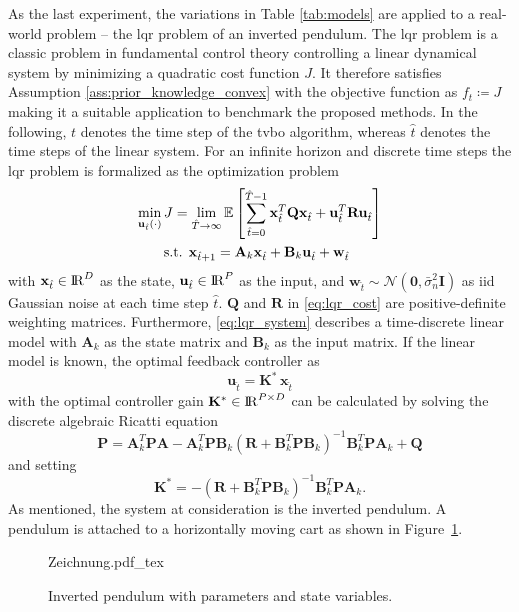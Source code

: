 As the last experiment, the variations in Table \ref{tab:models} are applied to a real-world problem -- the \gls{lqr} problem of an inverted pendulum. The \gls{lqr} problem is a classic problem in fundamental control theory controlling a linear dynamical system by minimizing a quadratic cost function $J$. It therefore satisfies Assumption \ref{ass:prior_knowledge_convex} with the objective function as $f_t \coloneqq J$ making it a suitable application to benchmark the proposed methods. In the following, $t$ denotes the time step of the \gls{tvbo} algorithm, whereas $\hat{t}$ denotes the time steps of the linear system. For an infinite horizon and discrete time steps the \gls{lqr} problem is formalized as the optimization problem
\begin{align}
    \min_{\mathbf{u}_{\hat{t}}(\cdot)}\, &J=\lim_{\hat{T} \to \infty} \operatorname{\mathbb{E}} \left[ \sum_{{\hat{t}}=0}^{\hat{T}-1} \mathbf{x}_{\hat{t}}^T \mathbf{Q}\mathbf{x}_{\hat{t}} +  \mathbf{u}_{\hat{t}}^T \mathbf{R}\mathbf{u}_{\hat{t}} \right] \label{eq:lqr_cost}\\
    &\text{s.t. }\mathbf{x}_{\hat{t}+1} = \mathbf{A}_k\mathbf{x}_{\hat{t}} + \mathbf{B}_k\mathbf{u}_{\hat{t}} + \mathbf{w}_{\hat{t}} \label{eq:lqr_system}
\end{align}
with $\mathbf{x}_{\hat{t}} \in \mathrm{I\!R}^D$ as the state, $\mathbf{u}_{\hat{t}} \in \mathrm{I\!R}^P$ as the input, and $\mathbf{w}_{\hat{t}} \sim \mathcal{N}(\mathbf{0}, \bar{\sigma}_n^2 \mathbf{I})$ as iid Gaussian noise at each time step $\hat{t}$. $\mathbf{Q}$ and $\mathbf{R}$ in \eqref{eq:lqr_cost} are positive-definite weighting matrices. Furthermore, \eqref{eq:lqr_system} describes a time-discrete linear model with $\mathbf{A}_k$ as the state matrix and $\mathbf{B}_k$ as the input matrix. If the linear model is known, the optimal feedback controller as
\begin{equation}
    \mathbf{u}_{\hat{t}} = \mathbf{K}^* \, \mathbf{x}_{\hat{t}}
\end{equation}
with the optimal controller gain $\mathbf{K}^* \in \mathrm{I\!R}^{P \times D}$ can be calculated by solving the discrete algebraic Ricatti equation
\begin{equation}
    \mathbf{P} = \mathbf{A}_k^T \mathbf{P} \mathbf{A}- \mathbf{A}_k^T \mathbf{P} \mathbf{B}_k \left(\mathbf{R}+\mathbf{B}_k^T \mathbf{P} \mathbf{B}_k\right)^{-1} \mathbf{B}_k^T \mathbf{P} \mathbf{A}_k+\mathbf{Q}
\end{equation}
and setting
\begin{equation}
    \mathbf{K}^* = -\left(\mathbf{R}+\mathbf{B}_k^T\mathbf{P}\mathbf{B}_k\right)^{-1} \mathbf{B}_k^T\mathbf{P}\mathbf{A}_k.
    \label{eq:optimal_controller}
\end{equation}
As mentioned, the system at consideration is the inverted pendulum. A pendulum is attached to a horizontally moving cart as shown in Figure~\ref{fig:inverted_pendulum}.
\begin{figure}[h]
   \centering
   \hspace{1cm}
   {Zeichnung.pdf_tex}
 \caption[Inverted pendulum.]{Inverted pendulum with parameters and state variables.}
 \label{fig:inverted_pendulum}
\end{figure}


